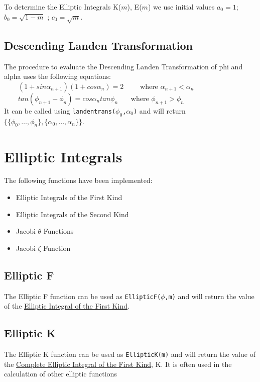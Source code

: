 To determine the Elliptic Integrals K($m$), E($m$) we use initial values
\(a_0 = 1\); \(b_0 = \sqrt{1-m}\) ; \(c_0 = \sqrt{m}\).


\subsection{Descending Landen Transformation}

The procedure to evaluate the Descending Landen Transformation of 
phi and alpha uses the following equations:\\
\indent \ \ \ \ \( (1+sin \alpha_{n+1})(1+cos \alpha_n)=2 \) 
\ \ \ \ where \(\alpha_{n+1}<\alpha_n\) \\
\indent \ \ \ \ \(tan(\phi_{n+1}-\phi_n)=cos \alpha_n tan \phi_n \) 
\ \ \ where \(\phi_{n+1}>\phi_n\) \\

It can be called using {\tt landentrans($\phi_0$,$\alpha_0$)}
and will return \\
$\{\{\phi_0, \ldots ,\phi_n\},\{\alpha_0, \ldots ,\alpha_n\}\}$.

\section{Elliptic Integrals}
The following functions have been implemented:

\begin{itemize}
\item Elliptic Integrals of the First Kind
\item Elliptic Integrals of the Second Kind
\item Jacobi $\theta$ Functions
\item Jacobi $\zeta$ Function
\end{itemize}

\subsection{Elliptic F}

The Elliptic F function can be used as {\tt EllipticF($\phi$,m)} and 
will return the value of the {\underline {Elliptic Integral of the 
First Kind}}.

\subsection{Elliptic K}

The Elliptic K function can be used as {\tt EllipticK(m)} and will 
return the value of the {\underline {Complete Elliptic Integral of the
First Kind}}, K. It is often used in the calculation of other elliptic
functions

